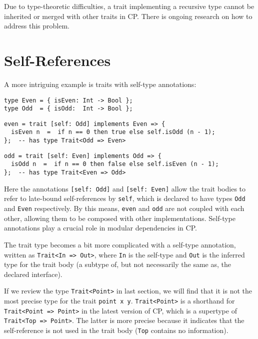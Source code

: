 \begin{tipblock}
Due to type-theoretic difficulties, a trait implementing a recursive type cannot
be inherited or merged with other traits in CP. There is ongoing research on how
to address this problem.
\end{tipblock}

\section{Self-References}

A more intriguing example is traits with self-type annotations:
\begin{lstlisting}
type Even = { isEven: Int -> Bool };
type Odd  = { isOdd:  Int -> Bool };
\end{lstlisting}
\vspace{-1ex}
\begin{lstlisting}
even = trait [self: Odd] implements Even => {
  isEven n  =  if n == 0 then true else self.isOdd (n - 1);
};  -- has type Trait<Odd => Even>
\end{lstlisting}
\vspace{-1ex}
\begin{lstlisting}
odd = trait [self: Even] implements Odd => {
  isOdd n  =  if n == 0 then false else self.isEven (n - 1);
};  -- has type Trait<Even => Odd>
\end{lstlisting}
Here the annotations \lstinline{[self: Odd]} and \lstinline{[self: Even]} allow
the trait bodies to refer to late-bound self-references by \lstinline{self},
which is declared to have types \lstinline{Odd} and \lstinline{Even}
respectively. By this means, \lstinline{even} and \lstinline{odd} are not
coupled with each other, allowing them to be composed with other
implementations. Self-type annotations play a crucial role in modular
dependencies in CP.

The trait type becomes a bit more complicated with a self-type annotation,
written as \lstinline{Trait<In => Out>}, where \lstinline{In} is the self-type
and \lstinline{Out} is the inferred type for the trait body (a subtype of, but
not necessarily the same as, the declared interface).

\begin{tipblock}
If we review the type \lstinline{Trait<Point>} in last section, we will find
that it is not the most precise type for the trait \lstinline{point x y}.
\lstinline{Trait<Point>} is a shorthand for \lstinline{Trait<Point => Point>} in
the latest version of CP, which is a supertype of \lstinline{Trait<Top => Point>}.
The latter is more precise because it indicates that the self-reference is not
used in the trait body (\lstinline{Top} contains no information).
\end{tipblock}

